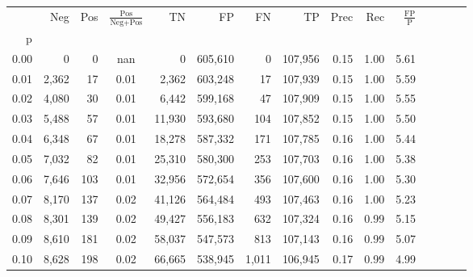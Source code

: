 \begin{tabular}{rrrcrrrrrrrrrrr}
\toprule
{} &    Neg &    Pos & $\frac{\text{Pos}}{\text{Neg}+\text{Pos}}$ &       TN &       FP &       FN &       TP &  Prec &   Rec & $\frac{\text{FP}}{\text{P}}$ \\
p    &        &        &                                            &          &          &          &          &       &       &                              \\
\midrule
0.00 &      0 &      0 &                                        nan &        0 &  605,610 &        0 &  107,956 &  0.15 &  1.00 &                         5.61 \\
0.01 &  2,362 &     17 &                                       0.01 &    2,362 &  603,248 &       17 &  107,939 &  0.15 &  1.00 &                         5.59 \\
0.02 &  4,080 &     30 &                                       0.01 &    6,442 &  599,168 &       47 &  107,909 &  0.15 &  1.00 &                         5.55 \\
0.03 &  5,488 &     57 &                                       0.01 &   11,930 &  593,680 &      104 &  107,852 &  0.15 &  1.00 &                         5.50 \\
0.04 &  6,348 &     67 &                                       0.01 &   18,278 &  587,332 &      171 &  107,785 &  0.16 &  1.00 &                         5.44 \\
0.05 &  7,032 &     82 &                                       0.01 &   25,310 &  580,300 &      253 &  107,703 &  0.16 &  1.00 &                         5.38 \\
0.06 &  7,646 &    103 &                                       0.01 &   32,956 &  572,654 &      356 &  107,600 &  0.16 &  1.00 &                         5.30 \\
0.07 &  8,170 &    137 &                                       0.02 &   41,126 &  564,484 &      493 &  107,463 &  0.16 &  1.00 &                         5.23 \\
0.08 &  8,301 &    139 &                                       0.02 &   49,427 &  556,183 &      632 &  107,324 &  0.16 &  0.99 &                         5.15 \\
0.09 &  8,610 &    181 &                                       0.02 &   58,037 &  547,573 &      813 &  107,143 &  0.16 &  0.99 &                         5.07 \\
0.10 &  8,628 &    198 &                                       0.02 &   66,665 &  538,945 &    1,011 &  106,945 &  0.17 &  0.99 &                         4.99 \\

\end{tabular}
